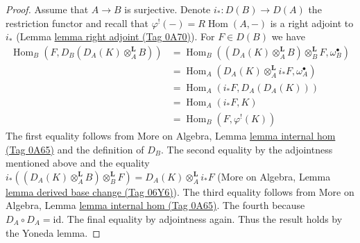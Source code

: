 \documentclass{amsart}
\theoremstyle{plain}
\theoremstyle{definition}
\theoremstyle{remark}
\numberwithin{equation}{subsection}
\def\Hom{\mathop{\mathrm{Hom}}\nolimits}
\begin{document}
\begin{proof}
\medskip\noindent
Assume that $A \to B$ is surjective. Denote $i_* : D(B) \to D(A)$
the restriction functor and recall that $\varphi^!(-) = R\Hom(A, -)$
is a right adjoint to $i_*$ (Lemma \href{https://stacks.math.columbia.edu/tag/0A70}{lemma right adjoint (Tag 0A70)}).
For $F \in D(B)$ we have
\begin{align*}
\Hom_B(F, D_B(D_A(K) \otimes_A^\mathbf{L} B))
& =
\Hom_B((D_A(K) \otimes_A^\mathbf{L} B) \otimes_B^\mathbf{L} F,
\omega_B^\bullet) \\
& =
\Hom_A(D_A(K) \otimes_A^\mathbf{L} i_*F, \omega_A^\bullet) \\
& =
\Hom_A(i_*F, D_A(D_A(K))) \\
& =
\Hom_A(i_*F, K) \\
& =
\Hom_B(F, \varphi^!(K))
\end{align*}
The first equality follows from More on Algebra, Lemma
\href{https://stacks.math.columbia.edu/tag/0A65}{lemma internal hom (Tag 0A65)} and the definition
of $D_B$. The second equality by the adjointness mentioned
above and the equality
$i_*((D_A(K) \otimes_A^\mathbf{L} B) \otimes_B^\mathbf{L} F) =
D_A(K) \otimes_A^\mathbf{L} i_*F$
(More on Algebra, Lemma \href{https://stacks.math.columbia.edu/tag/06Y6}{lemma derived base change (Tag 06Y6)}).
The third equality follows from More on Algebra, Lemma
\href{https://stacks.math.columbia.edu/tag/0A65}{lemma internal hom (Tag 0A65)}. The fourth because
$D_A \circ D_A = \text{id}$. The final equality by adjointness again.
Thus the result holds by the Yoneda lemma.
\end{proof}
\end{document}
